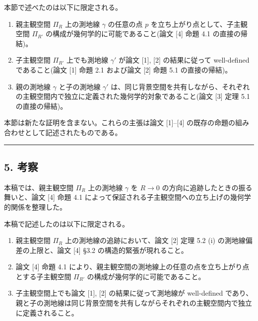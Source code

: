 \documentclass[a4paper,11pt]{ltjsarticle}
\theoremstyle{definition}
\providecommand{\tightlist}{\setlength{\itemsep}{0pt}\setlength{\parskip}{0pt}}
\begin{document}
本節で述べたのは以下に限定される。

\begin{enumerate}
\def\labelenumi{\arabic{enumi}.}
\tightlist
\item
  親主観空間 \(\Pi_R\) 上の測地線 \(\gamma\) の任意の点 \(p\) を立ち上がり点として、子主観空間 \(\Pi_{R'}\) の構成が幾何学的に可能であること(論文 {[}4{]} 命題 4.1 の直接の帰結)。
\item
  子主観空間 \(\Pi_{R'}\) 上でも測地線 \(\gamma'\) が論文 {[}1{]}, {[}2{]} の結果に従って well-defined であること(論文 {[}1{]} 命題 2.1 および論文 {[}2{]} 命題 5.1 の直接の帰結)。
\item
  親の測地線 \(\gamma\) と子の測地線 \(\gamma'\) は、同じ背景空間を共有しながら、それぞれの主観空間内で独立に定義された幾何学的対象であること(論文 {[}3{]} 定理 5.1 の直接の帰結)。
\end{enumerate}

本節は新たな証明を含まない。これらの主張は論文 {[}1{]}--{[}4{]} の既存の命題の組み合わせとして記述されたものである。

\begin{center}\rule{0.5\linewidth}{0.5pt}\end{center}

\subsection{5. 考察}\label{ux8003ux5bdf}

本稿では、親主観空間 \(\Pi_R\) 上の測地線 \(\gamma\) を \(R \to 0\) の方向に追跡したときの振る舞いと、論文 {[}4{]} 命題 4.1 によって保証される子主観空間への立ち上げの幾何学的関係を整理した。

本稿で記述したのは以下に限定される。

\begin{enumerate}
\def\labelenumi{\arabic{enumi}.}
\tightlist
\item
  親主観空間 \(\Pi_R\) 上の測地線の追跡において、論文 {[}2{]} 定理 5.2 (i) の測地線偏差の上限と、論文 {[}4{]} §3.2 の構造的緊張が現れること。
\item
  論文 {[}4{]} 命題 4.1 により、親主観空間の測地線上の任意の点を立ち上がり点とする子主観空間 \(\Pi_{R'}\) の構成が幾何学的に可能であること。
\item
  子主観空間上でも論文 {[}1{]}, {[}2{]} の結果に従って測地線が well-defined であり、親と子の測地線は同じ背景空間を共有しながらそれぞれの主観空間内で独立に定義されること。
\end{enumerate}
\end{document}
